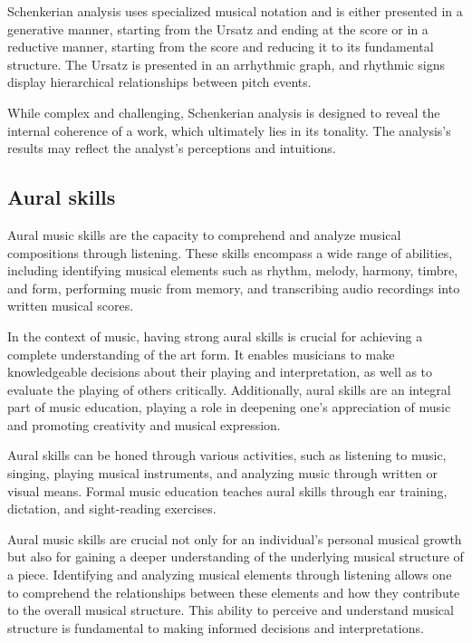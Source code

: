Schenkerian analysis uses specialized musical notation and is either presented in a generative manner, starting from the Ursatz and ending at the score or in a reductive manner, starting from the score and reducing it to its fundamental structure. The Ursatz is presented in an arrhythmic graph, and rhythmic signs display hierarchical relationships between pitch events.

While complex and challenging, Schenkerian analysis is designed to reveal the internal coherence of a work, which ultimately lies in its tonality. The analysis's results may reflect the analyst's perceptions and intuitions.

\subsection{Aural skills}

Aural music skills are the capacity to comprehend and analyze musical compositions through listening. These skills encompass a wide range of abilities, including identifying musical elements such as rhythm, melody, harmony, timbre, and form, performing music from memory, and transcribing audio recordings into written musical scores.

In the context of music, having strong aural skills is crucial for achieving a complete understanding of the art form. It enables musicians to make knowledgeable decisions about their playing and interpretation, as well as to evaluate the playing of others critically. Additionally, aural skills are an integral part of music education, playing a role in deepening one's appreciation of music and promoting creativity and musical expression.

Aural skills can be honed through various activities, such as listening to music, singing, playing musical instruments, and analyzing music through written or visual means. Formal music education teaches aural skills through ear training, dictation, and sight-reading exercises.

Aural music skills are crucial not only for an individual's personal musical growth but also for gaining a deeper understanding of the underlying musical structure of a piece. Identifying and analyzing musical elements through listening allows one to comprehend the relationships between these elements and how they contribute to the overall musical structure. This ability to perceive and understand musical structure is fundamental to making informed decisions and interpretations.

